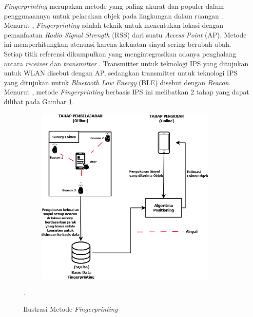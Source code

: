 \textit{Fingerprinting} merupakan metode yang paling akurat dan populer dalam penggunaannya untuk pelacakan objek pada lingkungan dalam ruangan \citep{Yim2010}. Menurut \citep{Muhammad2018}, \textit{Fingerprinting} adalah teknik untuk menentukan lokasi dengan pemanfaatan \textit{Radio Signal Strength} (RSS) dari suatu \textit{Access Point} (AP). Metode ini memperhitungkan atenuasi karena kekuatan sinyal sering berubah-ubah. Setiap titik referensi dikumpulkan yang mengintegrasikan adanya penghalang antara \textit{receiver} dan \textit{transmitter} \citep{Yudha2018}. Transmitter untuk teknologi IPS yang ditujukan untuk WLAN disebut dengan AP, sedangkan transmitter untuk teknologi IPS yang ditujukan untuk \textit{Bluetooth Low Energy} (BLE) disebut dengan \textit{Beacon}. Menurut \citep{Yudha2018}, metode \textit{Fingerprinting} berbasis IPS ini melibatkan 2 tahap yang dapat dilihat pada Gambar \ref{fingerprinting}.



\fancyhf{}
\fancyfoot[R]{\thepage}

\begin{figure}[H]
	\centering
	\shadowbox
	{\includegraphics [width = 11cm, height= 9cm]{gambar/fingerprinting}}
	\caption{Ilustrasi Metode \textit{Fingerprinting} }.
	\label{fingerprinting}
\end{figure}

